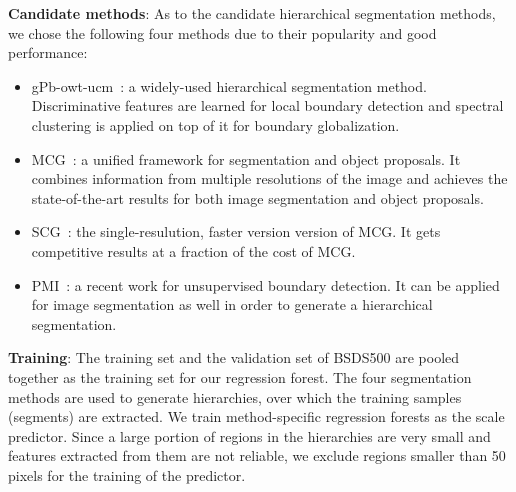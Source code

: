 \textbf{Candidate methods}:
As to the candidate hierarchical segmentation methods, we chose the
following four methods due to their popularity and good
performance:
\begin{itemize}
\item gPb-owt-ucm~\cite{arbelaez2011contour}: a widely-used
  hierarchical segmentation method. Discriminative features are learned
  for local boundary detection and spectral clustering is applied on
  top of it for boundary globalization.

\item MCG~\cite{arbelaez2014multiscale}: a unified framework for
  segmentation and object proposals. It combines information from
  multiple resolutions of the image and achieves the
  state-of-the-art results for both image segmentation and object proposals.

\item SCG~\cite{arbelaez2014multiscale}: the single-resulution,
  faster version version of MCG. It gets competitive results at a fraction of
  the cost of MCG.

\item PMI~\cite{isola2014crisp}: a recent work for unsupervised
  boundary detection. It can be applied for image segmentation as
  well in order to generate a hierarchical segmentation.
\end{itemize}


\textbf{Training}: The training set and the validation set of BSDS500
are pooled together as the training set for our regression forest. The
four segmentation methods are used to generate hierarchies,
over which the training samples (segments) are extracted.
We train method-specific regression forests
as the scale predictor.
Since a large portion of regions in the hierarchies are very small and
features extracted from them are not reliable, we exclude regions smaller
than 50 pixels for the training of the predictor.


